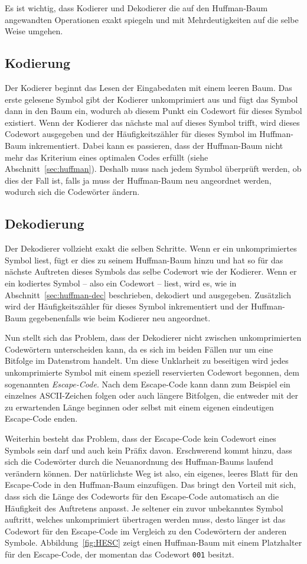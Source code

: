 \documentclass[twoside,11pt,a4paper]{article}
\theoremstyle{break}
\begin{document}
Es ist wichtig, dass Kodierer und Dekodierer die auf den Huffman-Baum
angewandten Operationen exakt spiegeln und mit Mehrdeutigkeiten auf
die selbe Weise umgehen.

\subsection{Kodierung}
Der Kodierer beginnt das Lesen der Eingabedaten mit einem leeren
Baum. Das erste gelesene Symbol gibt der Kodierer unkomprimiert aus
und fügt das Symbol dann in den Baum ein, wodurch ab diesem Punkt ein
Codewort für dieses Symbol existiert. Wenn der Kodierer das nächste
mal auf dieses Symbol trifft, wird dieses Codewort ausgegeben und der
Häufigkeitszähler für dieses Symbol im Huffman-Baum inkrementiert.
Dabei kann es passieren, dass der Huffman-Baum nicht mehr das
Kriterium eines optimalen Codes erfüllt (siehe
Abschnitt~\ref{sec:huffman}).  Deshalb muss nach jedem Symbol
überprüft werden, ob dies der Fall ist, falls ja muss der Huffman-Baum
neu angeordnet werden, wodurch sich die Codewörter ändern.

\subsection{Dekodierung}
Der Dekodierer vollzieht exakt die selben Schritte. Wenn er ein
unkomprimiertes Symbol liest, fügt er dies zu seinem Huffman-Baum
hinzu und hat so für das nächste Auftreten dieses Symbols das selbe
Codewort wie der Kodierer. Wenn er ein kodiertes Symbol -- also ein
Codewort -- liest, wird es, wie in Abschnitt~\ref{sec:huffman-dec}
beschrieben, dekodiert und ausgegeben. Zusätzlich wird der
Häufigkeitszähler für dieses Symbol inkrementiert und der Huffman-Baum
gegebenenfalls wie beim Kodierer neu angeordnet.

Nun stellt sich das Problem, dass der Dekodierer nicht zwischen
unkomprimierten Codewörtern unterscheiden kann, da es sich im beiden
Fällen nur um eine Bitfolge im Datenstrom handelt. Um diese Unklarheit
zu beseitigen wird jedes unkomprimierte Symbol mit einem speziell
reservierten Codewort begonnen, dem sogenannten \emph{Escape-Code}.
Nach dem Escape-Code kann dann zum Beispiel ein einzelnes
ASCII-Zeichen folgen oder auch längere Bitfolgen, die entweder mit der
zu erwartenden Länge beginnen oder selbst mit einem eigenen
eindeutigen Escape-Code enden.

Weiterhin besteht das Problem, dass der Escape-Code kein Codewort
eines Symbols sein darf und auch kein Präfix davon. Erschwerend kommt
hinzu, dass sich die Codewörter durch die Neuanordnung des
Huffman-Baums laufend verändern können. Der natürlichste Weg ist also,
ein eigenes, leeres Blatt für den Escape-Code in den Huffman-Baum
einzufügen. Das bringt den Vorteil mit sich, dass sich die Länge des
Codeworts für den Escape-Code automatisch an die Häufigkeit des
Auftretens anpasst. Je seltener ein zuvor unbekanntes Symbol auftritt,
welches unkomprimiert übertragen werden muss, desto länger ist das
Codewort für den Escape-Code im Vergleich zu den Codewörtern der
anderen Symbole. Abbildung~\ref{fig:HESC} zeigt einen Huffman-Baum mit
einem Platzhalter für den Escape-Code, der momentan das Codewort
{\tt001} besitzt.
\end{document}
